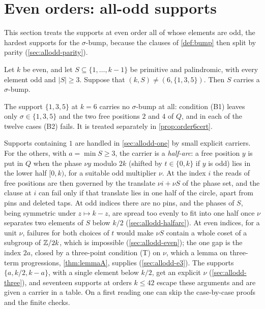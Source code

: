 \section{Even orders: all-odd supports}
\label{sec:allodd}

This section treats the supports at even order all of whose elements are odd,
the hardest supports for the $\sigma$-bump, because the clauses of
\autoref{def:bump} then split by parity (\autoref{sec:allodd-parity}).

\begin{theorem}
\label{thm:alloddall}
Let $k$ be even, and let $S\subseteq\{1,\dots,k-1\}$ be primitive and
palindromic, with every element odd and $|S|\ge3$. Suppose that
$(k,S)\ne(6,\{1,3,5\})$. Then $S$ carries a $\sigma$-bump.
\end{theorem}

The support $\{1,3,5\}$ at $k=6$ carries no $\sigma$-bump at all: condition
(B1) leaves only $\sigma\in\{1,3,5\}$ and the two free positions $2$ and $4$
of $Q$, and in each of the twelve cases (B2) fails. It is treated separately
in \autoref{prop:order6cert}.

Supports containing $1$ are handled in \autoref{sec:allodd-one} by small
explicit carriers. For the others, with $a=\min S\ge3$, the carrier is a
\emph{half-arc}: a free position $y$ is put in $Q$ when the phase
$\nu y$ modulo $2k$ (shifted by $t\in\{0,k\}$ if $y$ is odd) lies in the
lower half $[0,k)$, for a suitable odd multiplier $\nu$. At the index $i$ the
reads of free positions are then governed by the translate $\nu i+\nu S$ of
the phase set, and the clause at $i$ can fail only if that translate lies in
one half of the circle, apart from pins and deleted taps. At odd indices
there are no pins, and the phases of $S$, being symmetric under $z\mapsto
k-z$, are spread too evenly to fit into one half once $\nu$ separates two
elements of $S$ below $k/2$ (\autoref{sec:allodd-halfarc}). At even indices,
for a unit $\nu$, failures for both choices of $t$ would make $\nu S$ contain
a whole coset of a subgroup of $\mathbb{Z}/2k$, which is impossible
(\autoref{sec:allodd-even}); the one gap is the index $2a$, closed by a
three-point condition (T) on $\nu$, which a lemma on three-term
progressions, \autoref{thm:lemmaA}, supplies (\autoref{sec:allodd-e3}). The
supports $\{a,k/2,k-a\}$, with a single element below $k/2$, get an explicit
$\nu$ (\autoref{sec:allodd-three}), and seventeen supports at orders
$k\le42$ escape these arguments and are given a carrier in a table. On a
first reading one can skip the case-by-case proofs and the finite checks.

